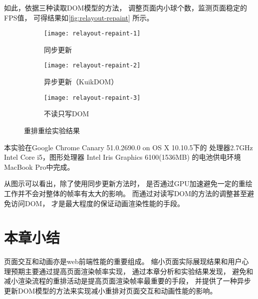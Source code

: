如此，依据三种读取DOM模型的方法，
调整页面内小球个数，监测页面稳定的FPS值，
可得结果如\autoref{fig:relayout-repaint} 所示。

\begin{figure}[htbp]
	\begin{subfigure}[b]{.5\textwidth}
		\centering
		\texttt{[image: relayout-repaint-1]}
		\caption{同步更新}\label{}
	\end{subfigure}
	\begin{subfigure}[b]{.5\textwidth}
		\centering
		\texttt{[image: relayout-repaint-2]}
		\caption{异步更新（KuikDOM）}\label{}
	\end{subfigure}
	\begin{subfigure}[b]{\textwidth}
		\centering
		\texttt{[image: relayout-repaint-3]}
		\caption{不读只写DOM}\label{}
	\end{subfigure}
	\caption{重排重绘实验结果}\label{fig:relayout-repaint}
\end{figure}


本实验在Google Chrome Canary 51.0.2690.0 on OS X 10.10.5下的
处理器2.7GHz Intel Core i5，图形处理器 Intel Iris Graphics 6100(1536MB)
的电池供电环境MacBook Pro中完成。

从图示可以看出，除了使用同步更新方法时，
是否通过GPU加速避免一定的重绘工作并不会对整体的帧率有太大的影响。
而通过对读写DOM的方法的调整甚至避免访问DOM，
才是最大程度的保证动画渲染性能的手段。


\section{本章小结}
页面交互和动画亦是web前端性能的重要组成。
缩小页面实际展现结果和用户心理预期主要通过提高页面渲染帧率实现，
通过本章分析和实验结果发现，
避免和减小渲染流程的重排活动是提高页面渲染帧率最重要的手段，
并提供了一种异步更新DOM模型的方法来实现减小重排对页面交互和动画性能的影响。
